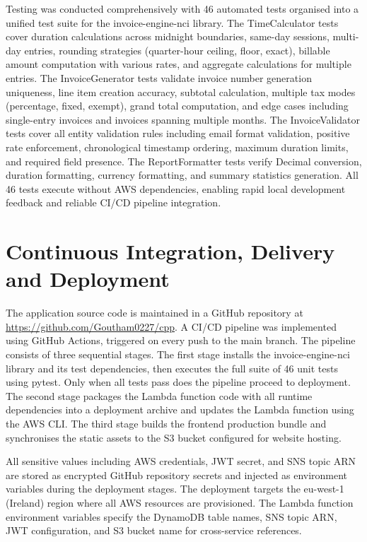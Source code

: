\documentclass[conference]{IEEEtran}
\begin{document}
Testing was conducted comprehensively with 46 automated tests organised into a unified test suite for the invoice-engine-nci library. The TimeCalculator tests cover duration calculations across midnight boundaries, same-day sessions, multi-day entries, rounding strategies (quarter-hour ceiling, floor, exact), billable amount computation with various rates, and aggregate calculations for multiple entries. The InvoiceGenerator tests validate invoice number generation uniqueness, line item creation accuracy, subtotal calculation, multiple tax modes (percentage, fixed, exempt), grand total computation, and edge cases including single-entry invoices and invoices spanning multiple months. The InvoiceValidator tests cover all entity validation rules including email format validation, positive rate enforcement, chronological timestamp ordering, maximum duration limits, and required field presence. The ReportFormatter tests verify Decimal conversion, duration formatting, currency formatting, and summary statistics generation. All 46 tests execute without AWS dependencies, enabling rapid local development feedback and reliable CI/CD pipeline integration.

\section{Continuous Integration, Delivery and Deployment}

The application source code is maintained in a GitHub repository at \url{https://github.com/Goutham0227/cpp}. A CI/CD pipeline was implemented using GitHub Actions, triggered on every push to the main branch. The pipeline consists of three sequential stages. The first stage installs the invoice-engine-nci library and its test dependencies, then executes the full suite of 46 unit tests using pytest. Only when all tests pass does the pipeline proceed to deployment. The second stage packages the Lambda function code with all runtime dependencies into a deployment archive and updates the Lambda function using the AWS CLI. The third stage builds the frontend production bundle and synchronises the static assets to the S3 bucket configured for website hosting.

All sensitive values including AWS credentials, JWT secret, and SNS topic ARN are stored as encrypted GitHub repository secrets and injected as environment variables during the deployment stages. The deployment targets the eu-west-1 (Ireland) region where all AWS resources are provisioned. The Lambda function environment variables specify the DynamoDB table names, SNS topic ARN, JWT configuration, and S3 bucket name for cross-service references.
\end{document}
